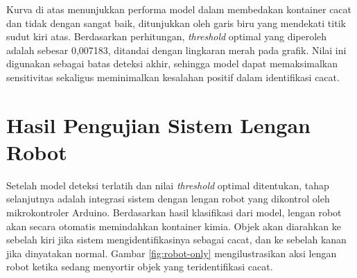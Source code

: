 Kurva di atas menunjukkan performa model dalam membedakan kontainer
cacat dan tidak dengan sangat baik, ditunjukkan oleh garis biru
yang mendekati titik sudut kiri atas. Berdasarkan perhitungan,
\textit{threshold} optimal yang diperoleh adalah sebesar 0,007183, ditandai
dengan lingkaran merah pada grafik. Nilai ini digunakan sebagai batas
deteksi akhir, sehingga model dapat memaksimalkan sensitivitas
sekaligus meminimalkan kesalahan positif dalam identifikasi cacat.

\vspace{1em}

\section{Hasil Pengujian Sistem Lengan Robot}

Setelah model deteksi terlatih dan nilai \textit{threshold} optimal
ditentukan, tahap selanjutnya adalah integrasi sistem dengan lengan
robot yang dikontrol oleh mikrokontroler Arduino. Berdasarkan hasil
klasifikasi dari model, lengan robot akan secara otomatis memindahkan
kontainer kimia. Objek akan diarahkan ke sebelah kiri jika sistem
mengidentifikasinya sebagai cacat, dan ke sebelah kanan jika
dinyatakan normal. Gambar \ref{fig:robot-only} mengilustrasikan aksi lengan
robot ketika sedang menyortir objek yang teridentifikasi cacat.

